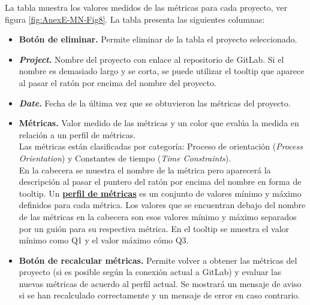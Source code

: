La tabla muestra los valores medidos de las métricas para cada proyecto, ver figura \ref{fig:AnexE-MN-Fig8}.
La tabla presenta las siguientes columnas:
\begin{itemize}
	\item \textbf{Botón de eliminar.} Permite eliminar de la tabla el proyecto seleccionado.
	\item \textbf{\textit{Project}.} Nombre del proyecto con enlace al repositorio de GitLab. Si el nombre es demasiado largo y se corta, se puede utilizar el tooltip que aparece al pasar el ratón por encima del nombre del proyecto.
	\item \textbf{\textit{Date}.} Fecha de la última vez que se obtuvieron las métricas del proyecto.
	\item \textbf{Métricas.} Valor medido de las métricas y un color que evalúa la medida en relación a un perfil de métricas.\\
	Las métricas están clasificadas por categoría: Proceso de orientación (\textit{Process Orientation}) y Constantes de tiempo (\textit{Time Constraints}).\\
	En la cabecera se muestra el nombre de la métrica pero aparecerá la descripción al pasar el puntero del ratón por encima del nombre en forma de tooltip.
	Un \textbf{\underline{perfil de métricas}} es un conjunto de valores mínimo y máximo definidos para cada métrica. Los valores que se encuentran debajo del nombre de las métricas en la cabecera son esos valores mínimo y máximo separados por un guión para su respectiva métrica. En el tooltip se muestra el valor mínimo como Q1 y el valor máximo cómo Q3.
	
	\item \textbf{Botón de recalcular métricas.} Permite volver a obtener las métricas del proyecto (si es posible según la conexión actual a GitLab) y evaluar las nuevas métricas de acuerdo al perfil actual. Se mostrará un mensaje de aviso si se han recalculado correctamente y un mensaje de error en caso contrario.
\end{itemize}



